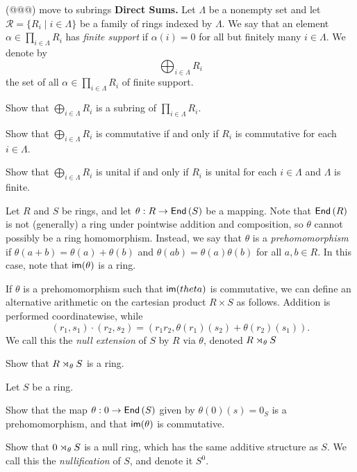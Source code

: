 \begin{exercise}
(@@@) move to subrings \textbf{Direct Sums.} Let \(\Lambda\) be a nonempty set and let \(\mathcal{R} = \{ R_i \mid i \in \Lambda \}\) be a family of rings indexed by \(\Lambda\). We say that an element \(\alpha \in \prod_{i \in \Lambda} R_i\) has \emph{finite support} if \(\alpha(i) = 0\) for all but finitely many \(i \in \Lambda\). We denote by \[ \bigoplus_{i \in \Lambda} R_i \] the set of all \(\alpha \in \prod_{i \in \Lambda} R_i\) of finite support.
\begin{proplist}
\item Show that \(\bigoplus_{i \in \Lambda} R_i\) is a subring of \(\prod_{i \in \Lambda} R_i\).
\item Show that \(\bigoplus_{i \in \Lambda} R_i\) is commutative if and only if \(R_i\) is commutative for each \(i \in \Lambda\).
\item Show that \(\bigoplus_{i \in \Lambda} R_i\) is unital if and only if \(R_i\) is unital for each \(i \in \Lambda\) and \(\Lambda\) is finite.
\end{proplist}
\end{exercise}

\begin{dfn}
Let \(R\) and \(S\) be rings, and let \(\theta : R \rightarrow  \mathsf{End}\left(S\right) \) be a mapping. Note that \( \mathsf{End}\left(R\right) \) is not (generally) a ring under pointwise addition and composition, so \(\theta\) cannot possibly be a ring homomorphism. Instead, we say that \(\theta\) is a \emph{prehomomorphism} if \(\theta(a + b) = \theta(a) + \theta(b)\) and \(\theta(ab) = \theta(a)\theta(b)\) for all \(a,b \in R\). In this case, note that \( \mathsf{im}(\theta) \) is a ring.

If \(\theta\) is a prehomomorphism such that \( \mathsf{im}(theta) \) is commutative, we can define an alternative arithmetic on the cartesian product \(R \times S\) as follows. Addition is performed coordinatewise, while \[ (r_1, s_1) \cdot (r_2, s_2) = (r_1r_2, \theta(r_1)(s_2) + \theta(r_2)(s_1)). \] We call this the \emph{null extension} of \(S\) by \(R\) via \(\theta\), denoted \(R \rtimes_{\theta} S\)
\end{dfn}

\begin{exercise}
Show that \(R \rtimes_{\theta} S\) is a ring.
\end{exercise}

\begin{exercise}
Let \(S\) be a ring.
\begin{proplist}
\item Show that the map \(\theta : 0 \rightarrow  \mathsf{End}\left(S\right) \) given by \(\theta(0)(s) = 0_S\) is a prehomomorphism, and that \( \mathsf{im}(\theta) \) is commutative.
\item Show that \(0 \rtimes_{\theta} S\) is a null ring, which has the same additive structure as \(S\). We call this the \emph{nullification} of \(S\), and denote it \(S^0\).
\end{proplist}
\end{exercise}

